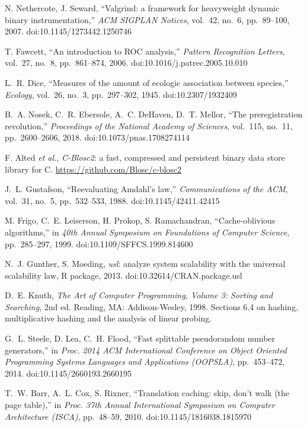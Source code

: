  N. Nethercote, J. Seward, ``Valgrind: a framework for heavyweight
  dynamic binary instrumentation,'' \emph{ACM SIGPLAN Notices}, vol.~42, no.~6, pp.~89--100,
  2007. doi:10.1145/1273442.1250746

 T. Fawcett, ``An introduction to ROC analysis,'' \emph{Pattern Recognition
  Letters}, vol.~27, no.~8, pp.~861--874, 2006. doi:10.1016/j.patrec.2005.10.010

 L.~R. Dice, ``Measures of the amount of ecologic association between
  species,'' \emph{Ecology}, vol.~26, no.~3, pp.~297--302, 1945. doi:10.2307/1932409

 B.~A. Nosek, C.~R. Ebersole, A.~C. DeHaven, D.~T. Mellor, ``The
  preregistration revolution,'' \emph{Proceedings of the National Academy of Sciences},
  vol.~115, no.~11, pp.~2600--2606, 2018. doi:10.1073/pnas.1708274114

 F. Alted \emph{et al.}, \emph{C-Blosc2}: a fast, compressed and persistent
  binary data store library for C. \url{https://github.com/Blosc/c-blosc2}

 J.~L. Gustafson, ``Reevaluating Amdahl's law,''
  \emph{Communications of the ACM}, vol.~31, no.~5, pp.~532--533, 1988.
  doi:10.1145/42411.42415

 M. Frigo, C.~E. Leiserson, H. Prokop, S. Ramachandran, ``Cache-oblivious
  algorithms,'' in \emph{40th Annual Symposium on Foundations of Computer Science},
  pp.~285--297, 1999. doi:10.1109/SFFCS.1999.814600

 N.~J. Gunther, S. Moeding, \emph{usl}: analyze system scalability with the universal
  scalability law, R package, 2013. doi:10.32614/CRAN.package.usl

 D.~E. Knuth, \emph{The Art of Computer Programming, Volume 3: Sorting and
  Searching}, 2nd ed. Reading, MA: Addison-Wesley, 1998. Sections 6.4 on hashing, multiplicative
  hashing and the analysis of linear probing.

 G.~L. Steele, D. Lea, C.~H. Flood, ``Fast splittable pseudorandom number
  generators,'' in \emph{Proc. 2014 ACM International Conference on Object Oriented Programming
  Systems Languages and Applications (OOPSLA)}, pp.~453--472, 2014. doi:10.1145/2660193.2660195

 T.~W. Barr, A.~L. Cox, S. Rixner, ``Translation caching: skip, don't walk (the
  page table),'' in \emph{Proc. 37th Annual International Symposium on Computer Architecture
  (ISCA)}, pp.~48--59, 2010. doi:10.1145/1816038.1815970

